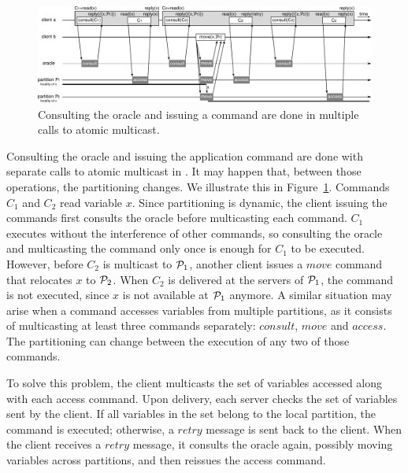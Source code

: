 \begin{figure}
\begin{minipage}[b]{1.0\linewidth}
\centering
      \includegraphics[width=1\linewidth]{figures/dssmr-detail}
\end{minipage}
\caption{Consulting the oracle and issuing a command are done in multiple calls to atomic multicast.}
\label{fig:dssmr-detail}
\end{figure}

Consulting the oracle and issuing the application command are done with separate
calls to atomic multicast in \dssmr{}. It may happen that, between those
operations, the partitioning changes. We illustrate this in
Figure~\ref{fig:dssmr-detail}. Commands $C_1$ and $C_2$ read variable $x$. Since
partitioning is dynamic, the client issuing the commands first consults the
oracle before multicasting each command. $C_1$ executes without the interference
of other commands, so consulting the oracle and multicasting the command only
once is enough for $C_1$ to be executed. However, before $C_2$ is multicast to
$\mathcal{P}_1$, another client issues a $move$ command that relocates $x$ to $\mathcal{P}_2$.
When $C_2$ is delivered at the servers of $\mathcal{P}_1$, the command is not executed,
since $x$ is not available at $\mathcal{P}_1$ anymore. A similar situation may arise
when a command accesses variables from multiple partitions, as it consists of
multicasting at least three commands separately: $consult$, $move$ and $access$.
The partitioning can change between the execution of any two of those commands.

To solve this problem, the client multicasts the set of variables accessed along
with each access command. Upon delivery, each server checks the set of variables
sent by the client. If all variables in the set belong to the local partition,
the command is executed; otherwise, a $retry$ message is sent back to the
client. When the client receives a $retry$ message, it consults the oracle
again, possibly moving variables across partitions, and then reissues the access
command. 

